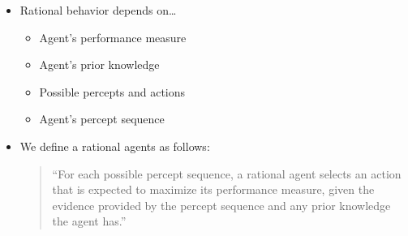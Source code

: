 \begin{itemize}
    \item Rational behavior depends on\ldots
        \begin{itemize}
            \item Agent’s performance measure
            \item Agent’s prior knowledge
            \item Possible percepts and actions
            \item Agent’s percept sequence
        \end{itemize}

    \item We define a rational agents as follows:
        \begin{quote}
            ``For each possible percept sequence, a rational agent selects an action that is expected to maximize its performance measure, given the evidence provided by the percept sequence and any prior knowledge the agent has.''
        \end{quote}


\end{itemize}
